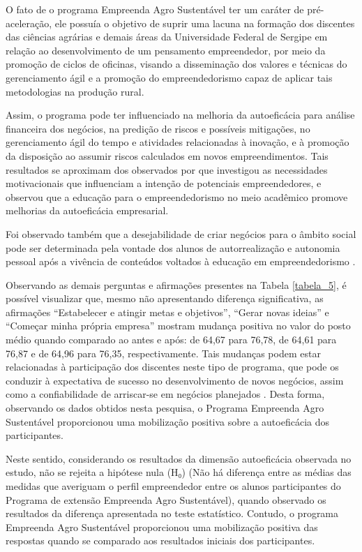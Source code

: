 O fato de o programa Empreenda Agro Sustentável ter um caráter de pré-aceleração, ele possuía o objetivo de suprir uma lacuna na formação dos discentes das ciências agrárias e demais áreas da Universidade Federal de Sergipe em relação ao desenvolvimento de um pensamento empreendedor, por meio da promoção de ciclos de oficinas, visando a disseminação dos valores e técnicas do gerenciamento ágil e a promoção do empreendedorismo capaz de aplicar tais metodologias na produção rural. 

Assim, o programa pode ter influenciado na melhoria da autoeficácia para análise financeira dos negócios, na predição de riscos e possíveis mitigações, no gerenciamento ágil do tempo e atividades relacionadas à inovação, e à promoção da disposição ao assumir riscos calculados em novos empreendimentos. Tais resultados se aproximam dos observados por  que investigou as necessidades motivacionais que influenciam a intenção de potenciais empreendedores, e observou que a educação para o empreendedorismo no meio acadêmico promove melhorias da autoeficácia empresarial. 

Foi observado também que a desejabilidade de criar negócios para o âmbito social pode ser determinada pela vontade dos alunos de autorrealização e autonomia pessoal após a vivência de conteúdos voltados à educação em empreendedorismo \cite{de_souza_qualidade_2017}.

Observando as demais perguntas e afirmações presentes na Tabela \ref{tabela_5}, é possível visualizar que, mesmo não apresentando diferença significativa, as afirmações “Estabelecer e atingir metas e objetivos”, “Gerar novas ideias” e “Começar minha própria empresa” mostram mudança positiva no valor do posto médio quando comparado ao antes e após: de 64,67 para 76,78, de 64,61 para 76,87 e de 64,96 para 76,35, respectivamente. Tais mudanças podem estar relacionadas à participação dos discentes neste tipo de programa, que pode os conduzir à expectativa de sucesso no desenvolvimento de novos negócios, assim como a confiabilidade de arriscar-se em negócios planejados \cite{nunes_associacoes_2011}. Desta forma, observando os dados obtidos nesta pesquisa, o Programa Empreenda Agro Sustentável proporcionou uma mobilização positiva sobre a autoeficácia dos participantes.

Neste sentido, considerando os resultados da dimensão autoeficácia observada no estudo, não se rejeita a hipótese nula (H₀) (Não há diferença entre as médias das medidas que averiguam o perfil empreendedor entre os alunos participantes do Programa de extensão Empreenda Agro Sustentável), quando observado os resultados da diferença apresentada no teste estatístico. Contudo, o programa Empreenda Agro Sustentável proporcionou uma mobilização positiva das respostas quando se comparado aos resultados iniciais dos participantes.



